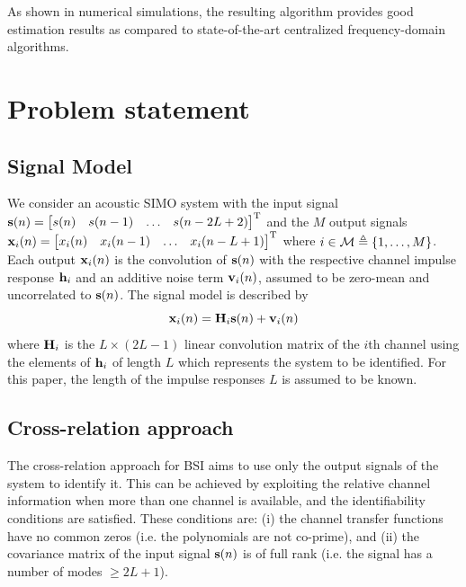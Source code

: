 \documentclass{article}
\begin{document}
As shown in numerical simulations, the resulting algorithm provides good estimation results as compared to state-of-the-art centralized frequency-domain algorithms.

\section{Problem statement}
\label{sec:problem_statement}

\subsection{Signal Model}
\label{ssec:signal_model}
We consider an acoustic SIMO system with the input signal \(\bm{\mathrm{s}}(n) = \begin{bmatrix}
    s(n)&s(n-1)&\ldots&s(n-2L+2)
\end{bmatrix}^{{\mathrm{T}}}\) and the \(M\) output signals \(\bm{\mathrm{x}}_i(n)= \begin{bmatrix}
    x_i(n)&x_i(n-1)&\ldots&x_i(n-L+1)
\end{bmatrix}^{{\mathrm{T}}}\)
where \(i \in \mathcal{M} \triangleq \{1, \ldots, M\} \).
Each output \(\bm{\mathrm{x}}_i(n)\) is the convolution of \(\bm{\mathrm{s}}(n)\) with the respective channel impulse response \(\bm{\mathrm{h}}_i\) and an additive noise term \(\bm{\mathrm{v}}_i(n)\), assumed to be zero-mean and uncorrelated to \(\bm{\mathrm{s}}(n)\).
The signal model is described by
\begin{equation}
    \bm{\mathrm{x}}_i(n) = \bm{\mathrm{H}}_i \bm{\mathrm{s}}(n) + \bm{\mathrm{v}}_i(n)
\end{equation}
where \(\bm{\mathrm{H}}_i\) is the \(L \times (2L-1)\) linear convolution matrix of the \(i\)th channel using the elements of \(\bm{\mathrm{h}}_i\) of length \(L\) which represents the system to be identified.
For this paper, the length of the impulse responses \(L\) is assumed to be known.

\subsection{Cross-relation approach}
\label{ssec:cross_rel}
The cross-relation approach for BSI aims to use only the output signals of the system to identify it.
This can be achieved by exploiting the relative channel information when more than one channel is available, and the identifiability conditions \cite{guanghanxuLeastsquaresApproachBlind1995} are satisfied. These conditions are: (i) the channel transfer functions have no common zeros (i.e. the polynomials are not co-prime), and (ii) the covariance matrix of the input signal \(\bm{\mathrm{s}}(n)\) is of full rank (i.e. the signal has a number of modes \(\geq 2L+1\)).
\end{document}
